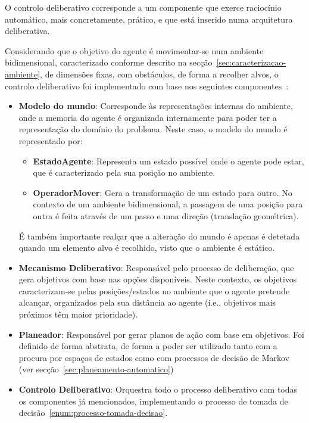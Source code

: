 O controlo deliberativo corresponde a um componente que exerce raciocínio automático, mais concretamente, prático, e que está inserido numa arquitetura deliberativa.

Considerando que o objetivo do agente é movimentar-se num ambiente bidimensional, caracterizado conforme descrito na secção~\ref{sec:caracterizacao-ambiente}, de dimensões fixas, com obstáculos, de forma a recolher alvos, o controlo deliberativo foi implementado com base nos seguintes componentes~\cite{isel:iasa:slides:arq-agentes-deliberativos}:

\begin{itemize}
    \item \textbf{Modelo do mundo}: Corresponde às representações internas do ambiente, onde a memoria do agente é organizada internamente para poder ter a representação do domínio do problema. Neste caso, o modelo do mundo é representado por:
    \begin{itemize}
        \item \textbf{EstadoAgente}: Representa um estado possível onde o agente pode estar, que é
        caracterizado pela sua posição no ambiente.
        \item \textbf{OperadorMover}: Gera a transformação de um estado para outro.
        No contexto de um ambiente bidimensional, a passagem de uma posição para outra é feita através de um passo e uma direção (translação geométrica).
    \end{itemize}
    É também importante realçar que a alteração do mundo é apenas é detetada quando um elemento alvo é recolhido, visto que o ambiente é estático.
    \item \textbf{Mecanismo Deliberativo}: Responsável pelo processo de deliberação, que gera objetivos com base nas opções disponíveis.
    Neste contexto, os objetivos caracterizam-se pelas posições/estados no ambiente que o agente pretende alcançar, organizados pela sua distância ao agente (i.e., objetivos mais próximos têm maior prioridade).
    \item \textbf{Planeador}: Responsável por gerar planos de ação com base em objetivos.
    Foi definido de forma abstrata, de forma a poder ser utilizado tanto com a procura por espaços de estados como com processos de decisão de Markov (ver secção~\ref{sec:planeamento-automatico})
    \item \textbf{Controlo Deliberativo}: Orquestra todo o processo deliberativo com todas os componentes já mencionados, implementando o processo de tomada de decisão~\ref{enum:processo-tomada-decisao}.
\end{itemize}

